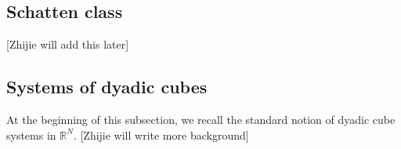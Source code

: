 \documentclass[12pt]{amsart}
\begin{document}
\subsection{Schatten class}
{\color{red}[Zhijie will add this later]}


\subsection{Systems of dyadic cubes}
At the beginning of this subsection, we recall the standard notion of dyadic cube systems in $\mathbb{R}^N$. {\color{red}[Zhijie will write more background]}
\end{document}
